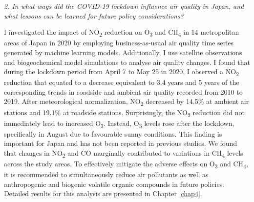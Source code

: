 \textit{2. In what ways did the COVID-19 lockdown influence air quality in Japan, and what lessons can be learned for future policy considerations?} \par
I investigated the impact of NO\textsubscript{2} reduction on O\textsubscript{3} and CH\textsubscript{4} in 14 metropolitan areas of Japan in 2020 by employing business-as-usual air quality time series generated by machine learning models. Additionally, I use satellite observations and biogeochemical model simulations to analyse air quality changes. I found that during the lockdown period from April 7 to May 25 in 2020, I observed a NO\textsubscript{2} reduction that equated to a decrease equivalent to 3.4 years and 5 years of the corresponding trends in roadside and ambient air quality recorded from 2010 to 2019. After meteorological normalization, NO\textsubscript{2} decreased by 14.5\% at ambient air stations and 19.1\% at roadside stations. Surprisingly, the NO\textsubscript{2} reduction did not immediately lead to increased O\textsubscript{3}. Instead, O\textsubscript{3} levels rose after the lockdown, specifically in August due to favourable sunny conditions. This finding is important for Japan and has not been reported in previous studies. We found that changes in NO\textsubscript{2} and CO marginally contributed to variations in CH\textsubscript{4} levels across the study areas. To effectively mitigate the adverse effects on O\textsubscript{3} and CH\textsubscript{4}, it is recommended to simultaneously reduce air pollutants as well as anthropogenic and biogenic volatile organic compounds in future policies. Detailed results for this analysis are presented in Chapter \ref{chap4}. \par

